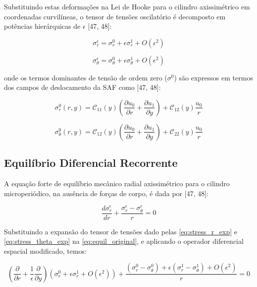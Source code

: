 Substituindo estas deformações na Lei de Hooke para o cilindro axissimétrico em coordenadas curvilíneas, o tensor de tensões oscilatório é decomposto em potências hierárquicas de $\epsilon$ [47, 48]:

\begin{equation}
  \sigma_r^\epsilon = \sigma_r^0 + \epsilon \sigma_r^1 + O(\epsilon^2)
  \label{eq:stress_r_exp}
\end{equation}

\begin{equation}
  \sigma_\theta^\epsilon = \sigma_\theta^0 + \epsilon \sigma_\theta^1 + O(\epsilon^2)
  \label{eq:stress_theta_exp}
\end{equation}

onde os termos dominantes de tensão de ordem zero ($\sigma^0$) são expressos em termos dos campos de deslocamento da SAF como [47, 48]:

\begin{equation}
  \sigma_r^0 (r, y) = \mathcal{C}_{11}(y) \left( \frac{\partial u_0}{\partial r} + \frac{\partial u_1}{\partial y} \right) + \mathcal{C}_{12}(y) \frac{u_0}{r}
  \label{eq:stress_r_zero}
\end{equation}

\begin{equation}
  \sigma_\theta^0 (r, y) = \mathcal{C}_{12}(y) \left( \frac{\partial u_0}{\partial r} + \frac{\partial u_1}{\partial y} \right) + \mathcal{C}_{22}(y) \frac{u_0}{r}
  \label{eq:stress_theta_zero}
\end{equation}

\subsection{Equilíbrio Diferencial Recorrente}

A equação forte de equilíbrio mecânico radial axissimétrico para o cilindro microperiódico, na ausência de forças de corpo, é dada por [47, 48]:

\begin{equation}
  \frac{d \sigma_r^\epsilon}{d r} + \frac{\sigma_r^\epsilon - \sigma_\theta^\epsilon}{r} = 0
  \label{eq:equil_original}
\end{equation}

Substituindo a expansão do tensor de tensões dado pelas \eqref{eq:stress_r_exp} e \eqref{eq:stress_theta_exp} na \eqref{eq:equil_original}, e aplicando o operador diferencial espacial modificado, temos:

\begin{equation}
  \left( \frac{\partial}{\partial r} + \frac{1}{\epsilon} \frac{\partial}{\partial y} \right) (\sigma_r^0 + \epsilon \sigma_r^1 + O(\epsilon^2)) + \frac{(\sigma_r^0 - \sigma_\theta^0) + \epsilon (\sigma_r^1 - \sigma_\theta^1) + O(\epsilon^2)}{r} = 0
  \label{eq:equil_substituted}
\end{equation}

